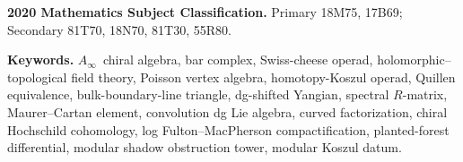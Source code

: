 \documentclass[11pt]{memoir}
\providecommand{\PhiFA}{\Phi^{\mathrm{FA}}}
\providecommand{\SpCh}{\mathrm{Sp}_{\mathrm{Ch}}}
\providecommand{\PhiFA}{\Phi^{\mathrm{FA}}}
\providecommand{\SpCh}{\mathrm{Sp}^{\mathrm{ch}}}
\begin{document}
\begin{abstract}
\noindent
The terminal scalar identity
$Z^{K3\times E}_{\mathrm{BPS}}=(\Phi_{10}^{\mathrm{un}})^{-1}$ is
the proved scalar component; its lift to a Vol~II gravity-line
partition function reduces to the Hall--Borcherds comparison
residual, and Vol~III lifts
the single reference curve $C$ to the two-stage factorisation
$\Phi_d = {\SpCh}_{\Sigma_{d-1},C} \circ \PhiFA_d$, so one
Calabi--Yau target $X$ carries a family of chiral shadows
parametrised by
$(\Sigma_{d-1},C) \in \mathrm{CycCurve}(X)$--the $(\infty,1)$-groupoid
of pairs of a smooth $(d-1)$-cycle $\Sigma_{d-1} \hookrightarrow X$
and a reference curve $C \hookrightarrow \Sigma_{d-1}$--and the
separate $\mathsf B$-row Mukai/conductor ceiling
$K^{\kappa_{\mathrm{ch}}} = 8$ recurs in the question of
which Borcherds weights $\kappa_{\mathrm{BKM}}(\Phi_N)$ realise
Mukai-enhanced ghost traces on each row of the $\Psi$-sibling
landscape $\{\Psi,\Psi^{\deg},\Psi^{\mathrm{tor}},\Psi^{\mathrm{metap}}\}$
of GN-reflective signature-$(2,n\!\ge\!3)$ BKMs.
\end{abstract}

\bigskip
\noindent
\textbf{2020 Mathematics Subject Classification.}
Primary 18M75, 17B69;
Secondary 81T70, 18N70, 81T30, 55R80.

\medskip
\noindent
\textbf{Keywords.}
$A_\infty$~chiral algebra, bar complex, Swiss-cheese operad,
holomorphic--topological field theory, Poisson vertex algebra,
homotopy-Koszul operad, Quillen equivalence, bulk-boundary-line
triangle, dg-shifted Yangian, spectral $R$-matrix, Maurer--Cartan
element, convolution dg Lie algebra, curved factorization, chiral
Hochschild cohomology, log Fulton--MacPherson compactification,
planted-forest differential, modular shadow obstruction tower, modular Koszul
datum.

\tableofcontents
\clearpage
\hypersetup{pageanchor=true}
\end{document}
